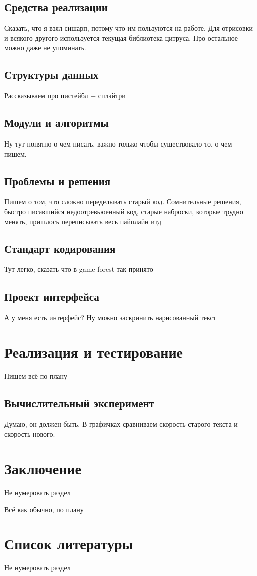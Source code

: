 \documentclass{fefu}
\begin{document}
	\subsection{Средства реализации}
	\par Сказать, что я взял сишарп, потому что им пользуются на работе. Для отрисовки и всякого другого используется текущая библиотека цитруса. Про остальное можно даже не упоминать.
	\subsection{Структуры данных}
	\par Рассказываем про пистейбл + сплэйтри
	\subsection{Модули и алгоритмы}
	\par Ну тут понятно о чем писать, важно только чтобы существовало то, о чем пишем.
	\subsection{Проблемы и решения}
	\par Пишем о том, что сложно переделывать старый код. Сомнительные решения, быстро писавшийся недоотревьюенный код, старые наброски, которые трудно менять, пришлось переписывать весь пайплайн итд
	\subsection{Стандарт кодирования}
	\par Тут легко, сказать что в game forest так принято
	\subsection{Проект интерфейса}
	\par А у меня есть интерфейс? Ну можно заскринить нарисованный текст
	
	\section{Реализация и тестирование}
	\par Пишем всё по плану
	\subsection{Вычислительный эксперимент}
	\par Думаю, он должен быть. В графичках сравниваем скорость старого текста и скорость нового.
	
	\section{Заключение}
	\par Не нумеровать раздел
	\par Всё как обычно, по плану
	
	\section{Список литературы}
	\par Не нумеровать раздел
	
\end{document}
